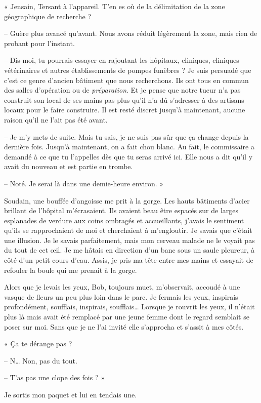 « Jensain, Tersant à l'appareil. T'en es où de la délimitation de la zone géographique de recherche ?

-- Guère plus avancé qu'avant. Nous avons réduit légèrement la zone, mais rien de probant pour l'instant.

-- Dis-moi, tu pourrais essayer en rajoutant les hôpitaux, cliniques, cliniques vétérinaires et autres établissements 
de pompes funèbres ? Je suis persuadé que c'est ce genre d'ancien bâtiment que nous recherchons. Ils ont tous en commun 
des salles d'opération ou de \emph{préparation}. Et je pense que notre tueur n'a pas construit son local de ses mains 
pas plus qu'il n'a dû s'adresser à des artisans locaux pour le faire construire. Il est resté discret jusqu'à 
maintenant, aucune raison qu'il ne l'ait pas été avant.

-- Je m'y mets de suite. Mais tu sais, je ne suis pas sûr que ça change depuis la dernière fois. Jusqu'à maintenant, 
on a fait chou blanc. Au fait, le commissaire a demandé à ce que tu l'appelles dès que tu seras arrivé ici. Elle nous
a dit qu'il y avait du nouveau et est partie en trombe.

-- Noté. Je serai là dans une demie-heure environ. »

Soudain, une bouffée d'angoisse me prit à la gorge. Les hauts bâtiments d'acier brillant de l'hôpital m'écrasaient. Ils 
avaient beau être espacés sur de larges esplanades de verdure aux coins ombragés et accueillants, j'avais le sentiment 
qu'ils se rapprochaient de moi et cherchaient à m'engloutir. Je savais que c'était une illusion. Je le savais 
parfaitement, mais mon cerveau malade ne le voyait pas du tout de cet œil. Je me hâtais en direction d'un banc sous un 
saule pleureur, à côté d'un petit cours d'eau. Assis, je pris ma tête entre mes mains et essayait de refouler la 
boule qui me prenait à la gorge.

Alors que je levais les yeux, Bob, toujours muet, m'observait, accoudé à une vasque de fleurs un peu plus loin dans le 
parc. Je fermais les yeux, inspirais profondément, soufflais, inspirais, soufflais… Lorsque je rouvrit les yeux, il 
n'était plus là mais avait été remplacé par une jeune femme dont le regard semblait se poser sur moi. Sans que je ne 
l'ai invité elle s'approcha et s'assit à mes côtés.

« Ça te dérange pas ?

-- N… Non, pas du tout.

-- T'as pas une clope des fois ? »

Je sortis mon paquet et lui en tendais une.

